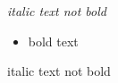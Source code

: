 




\it
italic text not bold

\begin{itemize}
\bf
\item bold text
\end{itemize}

italic text not bold

